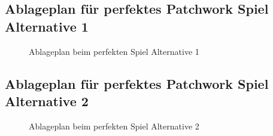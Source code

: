 \subsection{Ablageplan für perfektes Patchwork Spiel \textendash{} Alternative 1}
\label{anhang:section-ablageplan-perfektes-spiel-alternative-1}

\begin{figure}[!ht]
    \centering
    \caption{Ablageplan beim perfekten Spiel \textendash{} Alternative 1}
    \label{fig:max-score-quilt-board-alternative-1}
\end{figure}

\subsection{Ablageplan für perfektes Patchwork Spiel \textendash{} Alternative 2}
\label{anhang:section-ablageplan-perfektes-spiel-alternative-2}

\begin{figure}[!ht]
    \centering
    \caption{Ablageplan beim perfekten Spiel \textendash{} Alternative 2}
    \label{fig:max-score-quilt-board-alternative-2}
\end{figure}
